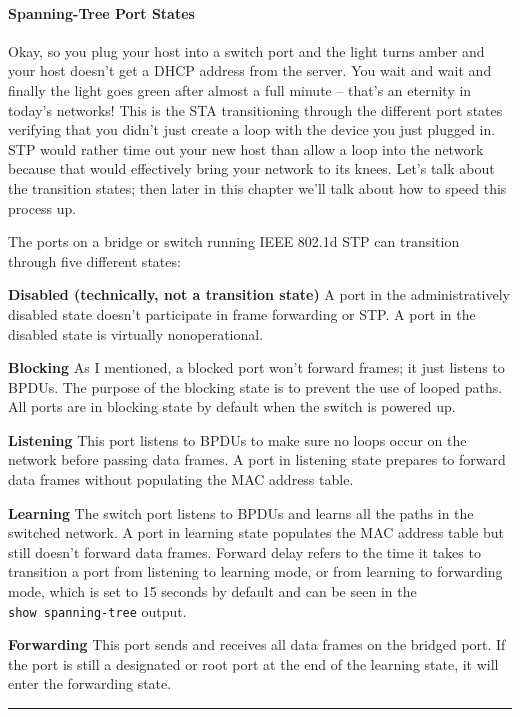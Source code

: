 \documentclass[b5paper,11pt]{memoir}
\begin{document}
\paragraph{Spanning-Tree Port States}

Okay, so you plug your host into a switch port and the light turns amber
and your host doesn't get a DHCP address from the server. You wait and
wait and finally the light goes green after almost a full
minute -- that's an eternity in today's networks! This is the STA
transitioning through the different port states verifying that you
didn't just create a loop with the device you just plugged in. STP would
rather time out your new host than allow a loop into the network because
that would effectively bring your network to its knees. Let's talk about
the transition states; then later in this chapter we'll talk about how
to speed this process up.

The ports on a bridge or switch running IEEE 802.1d STP can transition
through five different states:

\textbf{Disabled (technically, not a transition state)} A port in the
administratively disabled state doesn't participate in frame forwarding
or STP. A port in the disabled state is virtually nonoperational.

\textbf{Blocking} As I mentioned, a blocked port won't forward frames;
it just listens to BPDUs. The purpose of the blocking state is to
prevent the use of looped paths. All ports are in blocking state by
default when the switch is powered up.

\textbf{Listening} This port listens to BPDUs to make sure no loops
occur on the network before passing data frames. A port in listening
state prepares to forward data frames without populating the MAC address
table.

\textbf{Learning} The switch port listens to BPDUs and learns all the
paths in the switched network. A port in learning state populates the
MAC address table but still doesn't forward data frames. Forward delay
refers to the time it takes to transition a port from listening to
learning mode, or from learning to forwarding mode, which is set to 15
seconds by default and can be seen in the \texttt{show\ spanning-tree}
output.

\textbf{Forwarding}
This port sends and receives all data frames on the bridged port. If the
port is still a designated or root port at the end of the learning
state, it will enter the forwarding state.

\begin{center}\rule{0.5\linewidth}{0.5pt}\end{center}
\end{document}

